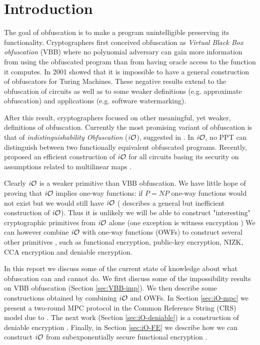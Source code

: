 
\section{Introduction}
The goal of obfuscation is to make a program unintelligible preserving its functionality.
Cryptographers first conceived obfuscation as \emph{Virtual Black Box obfuscation} (VBB) where
no polynomial adversary can gain more information from using the obfuscated program than from having
oracle access to the function it computes. In 2001 \cite{VBB-imp} showed that it is impossible to have a general construction of obfuscators for Turing Machines. These negative results extend to the obfuscation of circuits as well as to some weaker definitions (e.g. approximate obfuscation) and applications (e.g. software watermarking).

After this result, cryptographers focused on other meaningful, yet weaker, definitions of
obfuscation. Currently the most promising variant of obfuscation is that of \emph{indistinguishability Obfuscation} ($i\mathcal{O}$), suggested in \cite{VBB-imp}. In $i\mathcal{O}$, no PPT can distinguish between two functionally equivalent obfuscated programs. Recently, \cite{garg2013candidate} proposed an efficient construction of $i\mathcal{O}$ for all circuits basing its security on assumptions related to multilinear maps \cite{garg2013candidatemulti}.

Clearly $i\mathcal{O}$ is a weaker primitive than VBB obfuscation. We have little hope of proving that $i\mathcal{O}$ implies one-way functions: if $P = NP$ one-way functions would not exist but we would still have $i\mathcal{O}$ (\cite{VBB-imp} describes a general but inefficient construction of $i\mathcal{O}$). 
Thus it is unlikely we will be able to construct "interesting" cryptographic primitives from
$i\mathcal{O}$ alone (one exception is witness encryption \cite{}) %
We can however combine $i\mathcal{O}$ with one-way functions (OWFs) to construct several other primitives \cite{}, such as functional encryption, public-key encryption, NIZK, CCA encryption and deniable encryption. %


In this report we discuss some of the current state of knowledge about what obfuscation can and cannot do.
We first discuss some of the impossibility results on VBB obfuscation (Section \ref{sec:VBB-imp}). %
We then describe some constructions obtained by combining $i\mathcal{O}$ and OWFs. In Section \ref{sec:iO-mpc} we present a two-round MPC protocol in the Common Reference String (CRS) model due to \cite{iO-mpc}. The next work (Section \ref{sec:iO-deniable}) is a construction of deniable encryption \cite{iO-deniable}. Finally, in Section \ref{sec:iO-FE} we describe how we can construct $i\mathcal{O}$ from subexponentially secure functional encryption \cite{} %
\cite{iO-FE}.


